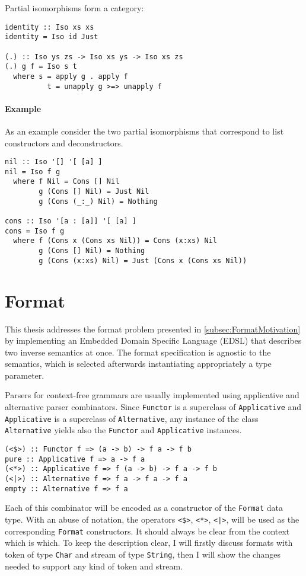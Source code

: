 \documentclass[../Thesis.tex]{subfiles}
\begin{document}
Partial isomorphisms form a category:
\begin{verbatim}
identity :: Iso xs xs
identity = Iso id Just

(.) :: Iso ys zs -> Iso xs ys -> Iso xs zs
(.) g f = Iso s t
  where s = apply g . apply f
          t = unapply g >=> unapply f
\end{verbatim}

\paragraph{Example} 
As an example consider the two partial isomorphisms that correspond
to list constructors and deconstructors. 

\begin{verbatim}
nil :: Iso '[] '[ [a] ]
nil = Iso f g
  where f Nil = Cons [] Nil
        g (Cons [] Nil) = Just Nil
        g (Cons (_:_) Nil) = Nothing

cons :: Iso '[a : [a]] '[ [a] ]
cons = Iso f g
  where f (Cons x (Cons xs Nil)) = Cons (x:xs) Nil
        g (Cons [] Nil) = Nothing
        g (Cons (x:xs) Nil) = Just (Cons x (Cons xs Nil))
\end{verbatim}

\section{Format}
\label{sec:Format}
This thesis addresses the format problem presented in 
\ref{subsec:FormatMotivation} by implementing an Embedded Domain Specific Language (EDSL) that describes two inverse semantics at once.
The format specification is agnostic to the semantics, which is selected afterwards instantiating appropriately a type parameter.

Parsers for context-free grammars are usually implemented using applicative 
and alternative parser combinators. Since \texttt{Functor} is a superclass of \texttt{Applicative} and \texttt{Applicative} is a superclass of \texttt{Alternative}, any instance of the class \texttt{Alternative} yields
also the \texttt{Functor} and \texttt{Applicative} instances.

\begin{verbatim}
(<$>) :: Functor f => (a -> b) -> f a -> f b
pure :: Applicative f => a -> f a
(<*>) :: Applicative f => f (a -> b) -> f a -> f b
(<|>) :: Alternative f => f a -> f a -> f a
empty :: Alternative f => f a
\end{verbatim} 

Each of this combinator will be encoded as a constructor of the \texttt{Format} data type. With an abuse of notation, the operators \texttt{<\$>}, \texttt{<*>}, \texttt{<|>}, will be used as the corresponding \texttt{Format} constructors. 
It should always be clear from the context which is which. 
To keep the description clear, I will firstly discuss formats with token of type \texttt{Char} and stream of type \texttt{String}, then I will show the changes needed to support any kind of token and stream.
\end{document}

